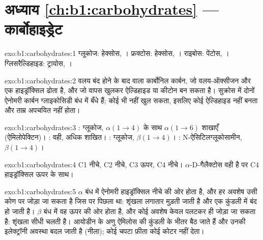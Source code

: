 \section*{अध्याय \ref{ch:b1:carbohydrates} --- कार्बोहाइड्रेट}

\begin{solution}{exo:b1:carbohydrates:1}
ग्लूकोज: हेक्सोस, । फ्रक्टोस: हेक्सोस, । राइबोस: पेंटोस,
। ग्लिसरैल्डिहाइड: ट्रायोस, ।
\end{solution}

\begin{solution}{exo:b1:carbohydrates:2}
वलय बंद होने के बाद वाला कार्बोनिल कार्बन, जो वलय-ऑक्सीजन और एक
हाइड्रॉक्सिल ढोता है, और जो वापस खुलकर ऐल्डिहाइड या कीटोन बन सकता है।
सुक्रोस में दोनों ऐनोमरी कार्बन ग्लाइकोसिडी बंध में बँधे हैं; कोई भी नहीं
खुल सकता, इसलिए कोई ऐल्डिहाइड नहीं बनता और ताम्र अपचयित नहीं होता।
\end{solution}

\begin{solution}{exo:b1:carbohydrates:3}
: ग्लूकोज, $\alpha(1{\to}4)$ के साथ $\alpha(1{\to}6)$ शाखाएँ
(ऐमिलोपेक्टिन)। : वही, अधिक शाखित। : ग्लूकोज,
$\beta(1{\to}4)$। : N-ऐसिटिलग्लूकोसामीन, $\beta(1{\to}4)$।
\end{solution}

\begin{solution}{exo:b1:carbohydrates:4}
C1 नीचे, C2 नीचे, C3 ऊपर, C4 नीचे। $\alpha$-D-गैलैक्टोस वही है पर
C4 हाइड्रॉक्सिल ऊपर के साथ।
\end{solution}

\begin{solution}{exo:b1:carbohydrates:5}
$\alpha$ बंध में ऐनोमरी हाइड्रॉक्सिल नीचे की ओर होता है, और हर
अवशेष उसी कोण पर जोड़ा जा सकता है जिस पर पिछला था: शृंखला लगातार मुड़ती
जाती है और एक कुंडली में बंद हो जाती है। $\beta$ बंध में वह ऊपर की ओर
होता है, और कोई अवशेष केवल पलटकर ही जोड़ा जा सकता है: शृंखला सीधी चलती है।
आयोडीन के अणु ऐमिलोस की कुंडली के भीतर बैठ जाते हैं और उनकी इलेक्ट्रॉनी
अवस्था बदल जाती है (नीला); कोई चपटा फ़ीता कोई कोटर नहीं देता।
\end{solution}

